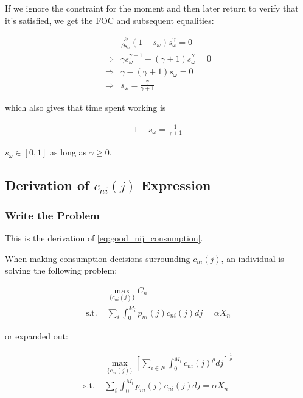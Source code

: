 \documentclass[10pt]{article}
\begin{document}
If we ignore the constraint for the moment 
and then later return to verify that it's satisfied, 
we get the FOC and subsequent equalities:

\begin{align}
    &\frac{\partial}{\partial s_\omega} \left(1-s_\omega\right) s_\omega^\gamma = 0 \\
    \Rightarrow &\gamma s_\omega^{\gamma-1}-(\gamma+1)s_\omega^\gamma = 0 \\
    \Rightarrow &\gamma - (\gamma+1)s_\omega = 0 \\
    \Rightarrow &s_\omega = \frac{\gamma}{\gamma+1}
\end{align}

which also gives that time spent working is

\begin{align}
    1 - s_\omega = \frac{1}{\gamma+1}
\end{align}

$s_\omega \in [0,1]$ as long as $\gamma \geq 0$.



\subsection{Derivation of $c_{n i}(j)$ Expression} 
\label{sec:good_nij_consumption}

\subsubsection{Write the Problem}
This is the derivation of \eqref{eq:good_nij_consumption}.

When making consumption decisions surrounding
$c_{n i}(j)$, an individual is solving the following problem:

\begin{align}
    &\underset{\{c_{n i}(j)\}}{\max} C_n \\ 
    \text{s.t. } &\sum_i \int_{0}^{M_i} p_{n i}(j) c_{n i}(j) d j=\alpha X_n
\end{align}

or expanded out:

\begin{align}
    &\underset{\{c_{n i}(j)\}}{\max} \left[\sum_{i \in N} \int_0^{M_i} c_{n i}(j)^\rho d j\right]^{\frac{1}{\rho}} \\
    \text{s.t. } &\sum_i \int_{0}^{M_i} p_{n i}(j) c_{n i}(j) d j=\alpha X_n
\end{align}
\end{document}
